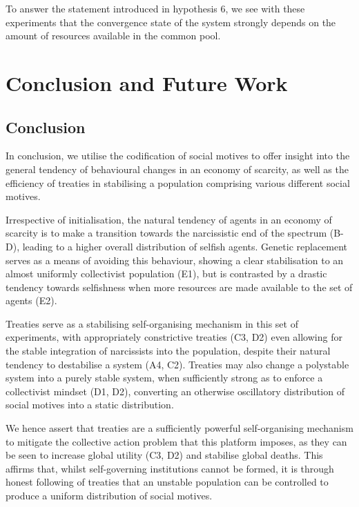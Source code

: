 To answer the statement introduced in hypothesis 6, we see with these experiments that the convergence state of the system strongly depends on the amount of resources available in the common pool.

 
\section{Conclusion and Future Work}\label{conclusion_future_work}

\subsection{Conclusion}

In conclusion, we utilise the codification of social motives to offer insight into the general tendency of behavioural changes in an economy of scarcity, as well as the efficiency of treaties in stabilising a population comprising various different social motives. 

Irrespective of initialisation, the natural tendency of agents in an economy of scarcity is to make a transition towards the narcissistic end of the spectrum (B-D), leading to a higher overall distribution of selfish agents. Genetic replacement serves as a means of avoiding this behaviour, showing a clear stabilisation to an almost uniformly collectivist population (E1), but is contrasted by a drastic tendency towards selfishness when more resources are made available to the set of agents (E2).

Treaties serve as a stabilising self-organising mechanism in this set of experiments, with appropriately constrictive treaties (C3, D2) even allowing for the stable integration of narcissists into the population, despite their natural tendency to destabilise a system (A4, C2). Treaties may also change a polystable system into a purely stable system, when sufficiently strong as to enforce a collectivist mindset (D1, D2), converting an otherwise oscillatory distribution of social motives into a static distribution.

We hence assert that treaties are a sufficiently powerful self-organising mechanism to mitigate the collective action problem that this platform imposes, as they can be seen to increase global utility (C3, D2) and stabilise global deaths. This affirms that, whilst self-governing institutions cannot be formed, it is through honest following of treaties that an unstable population can be controlled to produce a uniform distribution of social motives.
 
